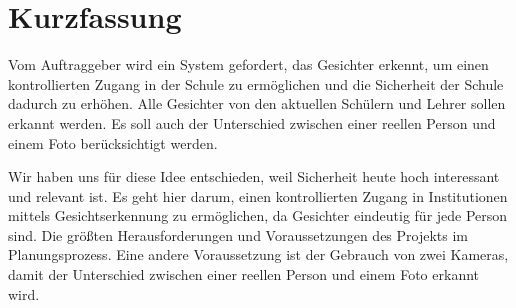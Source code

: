 \chapter*{Kurzfassung}

\begin{flushleft}
	Vom Auftraggeber wird ein System gefordert, das Gesichter erkennt, um einen kontrollierten Zugang in der Schule zu ermöglichen und die Sicherheit der Schule dadurch zu erh\"ohen. Alle Gesichter von den aktuellen Sch\"ulern und Lehrer sollen erkannt werden. Es soll auch der Unterschied zwischen einer reellen Person und einem Foto berücksichtigt werden.
	
	Wir haben uns für diese Idee entschieden, weil Sicherheit heute hoch interessant und relevant ist. Es geht hier darum, einen kontrollierten Zugang in Institutionen mittels Gesichtserkennung zu ermöglichen, da Gesichter eindeutig für jede Person sind. Die größten Herausforderungen und Voraussetzungen des Projekts im Planungsprozess. Eine andere Voraussetzung ist der Gebrauch von zwei Kameras, damit der Unterschied zwischen einer reellen Person und einem Foto erkannt wird.
		
\end{flushleft}

\color{black} 
